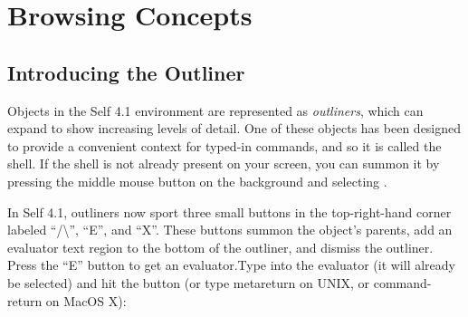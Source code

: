 \documentclass[letterpaper,10pt,english]{sphinxmanual}
\begin{document}
\section{Browsing Concepts}
\label{howtoprg:browsing-concepts}

\subsection{Introducing the Outliner}
\label{howtoprg:introducing-the-outliner}
Objects in the Self 4.1 environment are represented as \emph{outliners}, which can expand to show increasing
levels of detail. One of these objects has been designed to provide a convenient context
for typed-in commands, and so it is called the shell. If the shell is not already present on your
screen, you can summon it by pressing the middle mouse button on the background and selecting
.
\begin{figure}[htbp]\begin{flushleft}

\end{flushleft}\end{figure}

In Self 4.1, outliners now sport three small buttons in the top-right-hand corner labeled “/\textbackslash{}”, “E”,
and “X”. These buttons summon the object’s parents, add an evaluator text region to the bottom of
the outliner, and dismiss the outliner. Press the “E” button to get an evaluator.Type  into
the evaluator (it will already be selected) and hit the  button (or type metareturn
on UNIX, or command-return on MacOS X):
\begin{figure}[htbp]\begin{flushleft}

\end{flushleft}\end{figure}
\end{document}
